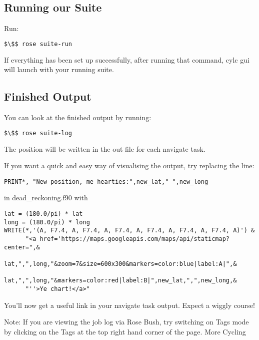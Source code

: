 \subsection{Running our Suite}

Run:

\begin{lstlisting}[mathescape, language=bash]
$\$$ rose suite-run
\end{lstlisting}

If everything has been set up successfully, after running that command, cylc gui will launch with your running suite.

\subsection{Finished Output}

You can look at the finished output by running:

\begin{lstlisting}[mathescape, language=bash]
$\$$ rose suite-log
\end{lstlisting}

The position will be written in the out file for each navigate task.

If you want a quick and easy way of visualising the output, try replacing the line:

\lstset{language=Fortran}
\begin{lstlisting}[columns=fullflexible]
PRINT*, "New position, me hearties:",new_lat," ",new_long
\end{lstlisting}

in dead\_reckoning.f90 with

\lstset{language=Fortran}
\begin{lstlisting}[columns=fullflexible]
lat = (180.0/pi) * lat
long = (180.0/pi) * long
WRITE(*,'(A, F7.4, A, F7.4, A, F7.4, A, F7.4, A, F7.4, A, F7.4, A)') &
      "<a href='https://maps.googleapis.com/maps/api/staticmap?center=",&
      lat,",",long,"&zoom=7&size=600x300&markers=color:blue|label:A|",&
      lat,",",long,"&markers=color:red|label:B|",new_lat,",",new_long,&
      "''>Ye chart!</a>"
\end{lstlisting}

You'll now get a useful link in your navigate task output. Expect a wiggly course!

Note: If you are viewing the job log via Rose Bush, try switching on Tags mode by clicking on the Tags at the top right hand corner of the page.
More Cycling

